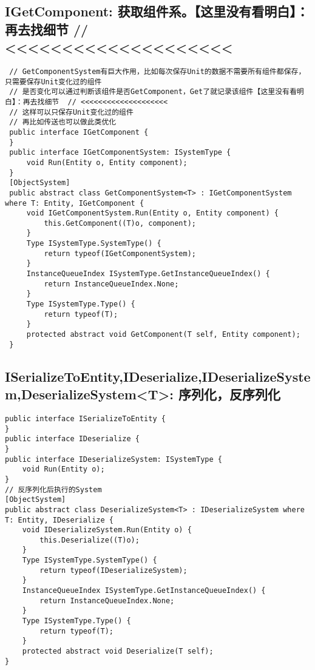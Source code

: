 \documentclass[9pt, b5paper]{article}
\begin{document}
\subsection{IGetComponent: 获取组件系。【这里没有看明白】：再去找细节  // <<<<<<<<<<<<<<<<<<<<}
\label{sec-1-15}
\begin{verbatim}
 // GetComponentSystem有巨大作用，比如每次保存Unit的数据不需要所有组件都保存，只需要保存Unit变化过的组件
 // 是否变化可以通过判断该组件是否GetComponent，Get了就记录该组件【这里没有看明白】：再去找细节  // <<<<<<<<<<<<<<<<<<<< 
 // 这样可以只保存Unit变化过的组件
 // 再比如传送也可以做此类优化
 public interface IGetComponent {
 }
 public interface IGetComponentSystem: ISystemType {
     void Run(Entity o, Entity component);
 }
 [ObjectSystem]
 public abstract class GetComponentSystem<T> : IGetComponentSystem where T: Entity, IGetComponent {
     void IGetComponentSystem.Run(Entity o, Entity component) {
         this.GetComponent((T)o, component);
     }
     Type ISystemType.SystemType() {
         return typeof(IGetComponentSystem);
     }
     InstanceQueueIndex ISystemType.GetInstanceQueueIndex() {
         return InstanceQueueIndex.None;
     }
     Type ISystemType.Type() {
         return typeof(T);
     }
     protected abstract void GetComponent(T self, Entity component);
 }
\end{verbatim}
\subsection{ISerializeToEntity,IDeserialize,IDeserializeSystem,DeserializeSystem<T>: 序列化，反序列化}
\label{sec-1-16}
\begin{verbatim}
public interface ISerializeToEntity {
}
public interface IDeserialize {
}
public interface IDeserializeSystem: ISystemType {
    void Run(Entity o);
}
// 反序列化后执行的System
[ObjectSystem]
public abstract class DeserializeSystem<T> : IDeserializeSystem where T: Entity, IDeserialize {
    void IDeserializeSystem.Run(Entity o) {
        this.Deserialize((T)o);
    }
    Type ISystemType.SystemType() {
        return typeof(IDeserializeSystem);
    }
    InstanceQueueIndex ISystemType.GetInstanceQueueIndex() {
        return InstanceQueueIndex.None;
    }
    Type ISystemType.Type() {
        return typeof(T);
    }
    protected abstract void Deserialize(T self);
}
\end{verbatim}
\end{document}
